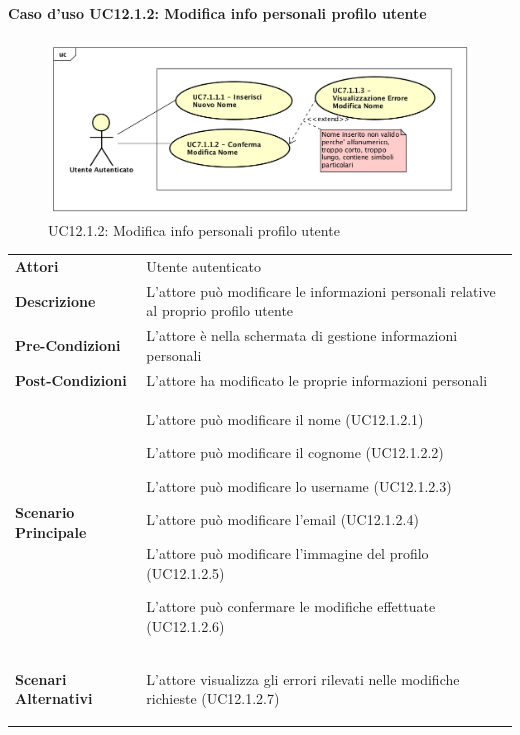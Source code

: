 \paragraph{Caso d'uso UC12.1.2: Modifica info personali profilo utente}
\label{UC12_1_2}
\begin{figure}[ht]
	\centering
	\includegraphics[scale=0.45]{UML/UC12_1_1.png}
	\caption{UC12.1.2: Modifica info personali profilo utente}
\end{figure}
\FloatBarrier
\begin{tabular}{ l | p{11cm}}
	\hline
	\rowcolor{Gray}
	\multicolumn{2}{c}{UC12.1.2 - Modifica info personali profilo utente} \\
	\hline
	\textbf{Attori} & Utente autenticato \\
	\textbf{Descrizione} & L'attore può modificare le informazioni personali relative al proprio profilo utente\\
	\textbf{Pre-Condizioni} & L'attore è nella schermata di gestione informazioni personali\\
	\textbf{Post-Condizioni} & L'attore ha modificato le proprie informazioni personali \\
	\textbf{Scenario Principale} & 
	\begin{enumerate*}[label=(\arabic*.),itemjoin={\newline}]
		\item L'attore può modificare il nome (UC12.1.2.1)
		\item L'attore può modificare il cognome (UC12.1.2.2)
		\item L'attore può modificare lo username (UC12.1.2.3)
		\item L'attore può modificare l'email (UC12.1.2.4)
		\item L'attore può modificare l'immagine del profilo (UC12.1.2.5)
		\item L'attore può confermare le modifiche effettuate (UC12.1.2.6)
	\end{enumerate*}\\
	\textbf{Scenari Alternativi} & 
	\begin{enumerate*}[label=(\arabic*.),itemjoin={\newline}]
		\item L'attore visualizza gli errori rilevati nelle modifiche richieste (UC12.1.2.7)
	\end{enumerate*}\\
\end{tabular}

